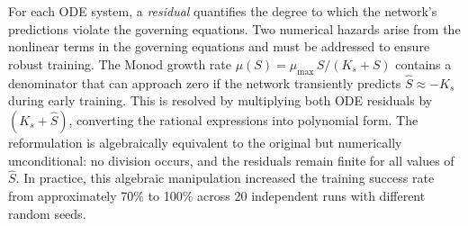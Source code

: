 \documentclass[14pt,a4paper,openany]{extbook}
\begin{document}
For each ODE system, a \emph{residual} quantifies the degree to which the
network's predictions violate the governing equations. Two numerical hazards arise from the nonlinear terms in the governing
equations and must be addressed to ensure robust training. The Monod growth rate $\mu(S) = \mu_{\max}\,S / (K_s + S)$ contains a
denominator that can approach zero if the network transiently predicts
$\hat{S} \approx -K_s$ during early training.  This is resolved by
multiplying both ODE residuals by $(K_s + \hat{S})$, converting the
rational expressions into polynomial form.  The reformulation is
algebraically equivalent to the original but numerically unconditional: no
division occurs, and the residuals remain finite for all values of
$\hat{S}$.  In practice, this algebraic manipulation increased the training
success rate from approximately 70\% to 100\% across 20 independent runs
with different random seeds.
\end{document}
